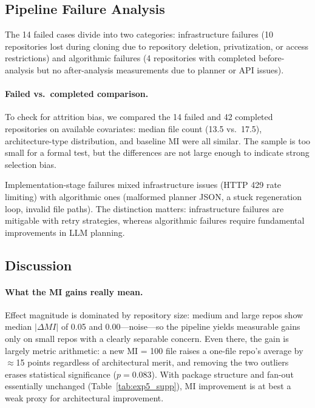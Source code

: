 \documentclass[runningheads]{llncs}
\begin{document}
\subsection{Pipeline Failure Analysis}

The 14 failed cases divide into two categories: infrastructure failures (10 repositories lost during cloning due to repository deletion, privatization, or access restrictions) and algorithmic failures (4 repositories with completed before-analysis but no after-analysis measurements due to planner or API issues).

\paragraph{Failed vs.\ completed comparison.}
To check for attrition bias, we compared the 14 failed and 42 completed repositories on available covariates: median file count (13.5 vs.\ 17.5), architecture-type distribution, and baseline MI were all similar. The sample is too small for a formal test, but the differences are not large enough to indicate strong selection bias.

Implementation-stage failures mixed infrastructure issues (HTTP 429 rate limiting) with algorithmic ones (malformed planner JSON, a stuck regeneration loop, invalid file paths). The distinction matters: infrastructure failures are mitigable with retry strategies, whereas algorithmic failures require fundamental improvements in LLM planning.

\subsection{Discussion}

\paragraph{What the MI gains really mean.} Effect magnitude is dominated by repository size: medium and large repos show median $|\Delta MI|$ of 0.05 and 0.00---noise---so the pipeline yields measurable gains only on small repos with a clearly separable concern. Even there, the gain is largely metric arithmetic: a new MI = 100 file raises a one-file repo's average by $\approx$15 points regardless of architectural merit, and removing the two outliers erases statistical significance ($p = 0.083$). With package structure and fan-out essentially unchanged (Table~\ref{tab:exp5_supp}), MI improvement is at best a weak proxy for architectural improvement.
\end{document}
